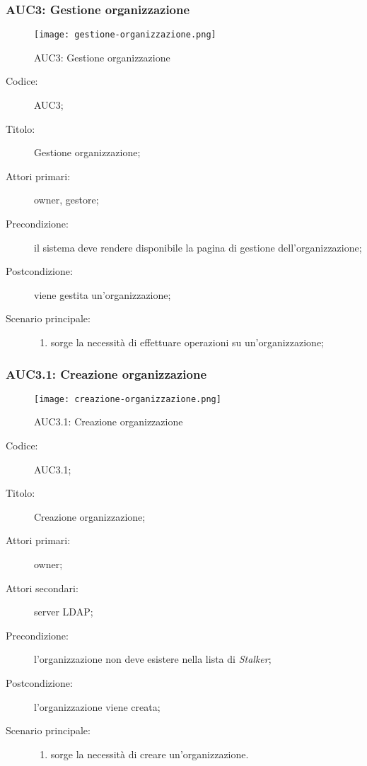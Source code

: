 \documentclass[../../../analisi-dei-requisiti.tex]{subfiles}
\begin{document}
\subsubsection{AUC3: Gestione organizzazione}%
\label{subs:AUC3}

\begin{figure}[H]
  \centering
  \texttt{[image: gestione-organizzazione.png]}
  \caption{AUC3: Gestione organizzazione}%
  \label{fig:AUC3}
\end{figure}

\begin{description}
  \item[Codice:] AUC3;
  \item[Titolo:] Gestione organizzazione;
  \item[Attori primari:] owner, gestore;
  \item[Precondizione:] il sistema deve rendere disponibile la pagina di gestione dell'organizzazione;
  \item[Postcondizione:] viene gestita un'organizzazione;
  \item[Scenario principale:]
        \begin{enumerate}
          \item sorge la necessità di effettuare operazioni su un'organizzazione;
        \end{enumerate}
\end{description}

\subsubsection{AUC3.1: Creazione organizzazione}%
\label{subs:AUC3.1}

\begin{figure}[H]
  \centering
  \texttt{[image: creazione-organizzazione.png]}
  \caption{AUC3.1: Creazione organizzazione}%
  \label{fig:AUC3_1}
\end{figure}

\begin{description}
  \item[Codice:] AUC3.1;
  \item[Titolo:] Creazione organizzazione;
  \item[Attori primari:] owner;
  \item[Attori secondari:] server LDAP\@;
  \item[Precondizione:] l'organizzazione non deve esistere nella lista di \emph{Stalker};
  \item[Postcondizione:] l'organizzazione viene creata;
  \item[Scenario principale:]
        \begin{enumerate}
          \item sorge la necessità di creare un'organizzazione.
        \end{enumerate}
\end{description}
\end{document}
